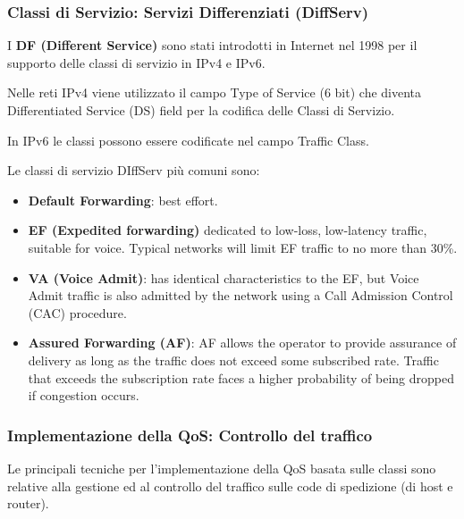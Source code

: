         \subsubsection{Classi di Servizio: Servizi Differenziati (DiffServ)}
            I \textbf{DF (Different Service)} sono stati introdotti in Internet nel 1998 per il supporto delle classi di servizio in IPv4 e IPv6.
        
            Nelle reti IPv4 viene utilizzato il campo Type of Service (6 bit) che diventa Differentiated Service (DS) field per la codifica delle Classi di Servizio.
        
            In IPv6 le classi possono essere codificate nel campo Traffic Class.
        
            Le classi di servizio DIffServ più comuni sono:
            \begin{itemize}
                \item \textbf{Default Forwarding}: best effort.
                \item \textbf{EF (Expedited forwarding)} dedicated to low-loss, low-latency traffic, suitable for voice. Typical networks will limit EF traffic to no more than 30\%.
                \item \textbf{VA (Voice Admit)}: has identical characteristics to the EF, but Voice Admit traffic is also admitted by the network using a Call Admission Control (CAC) procedure.
                \item \textbf{Assured Forwarding (AF)}: AF allows the operator to provide assurance of delivery as long as the traffic does not exceed some subscribed rate. Traffic that exceeds the subscription rate faces a higher probability of being dropped if congestion occurs.
            \end{itemize}

            \subsubsection{Implementazione della QoS: Controllo del traffico}
                Le principali tecniche per l'implementazione della QoS basata sulle classi sono relative alla gestione ed al controllo del traffico sulle code di spedizione (di host e router).
            
